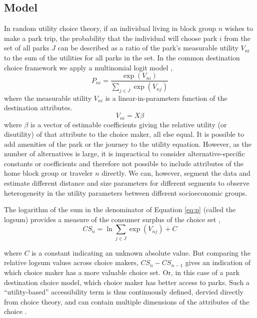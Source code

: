 \documentclass[3p, authoryear]{elsarticle} %
\begin{document}
\hypertarget{model}{%
\subsection{Model}\label{model}}

In random utility choice theory, if an individual living in block group \(n\)
wishes to make a park trip, the probability that the individual will choose
park \(i\) from the set of all parks \(J\) can be described as a ratio of the
park's measurable utility \(V_{ni}\) to the sum of the utilities for all parks
in the set. In the common destination choice framework we apply a
multinomial logit model \citep[\citet{Recker1978}]{McFadden1974},
\begin{equation}\label{eq:p}
   P_{ni} = \frac{\exp(V_{ni})}{\sum_{j \in J}\exp(V_{nj})}
\end{equation}
where the measurable utility \(V_{ni}\) is a linear-in-parameters function of
the destination attributes.
\begin{equation}\label{eq:V}
V_{ni} = X\beta
\end{equation}
where \(\beta\) is a vector of estimable coefficients giving the relative utility
(or disutility) of that attribute to the choice maker, all else equal. It is
possible to add amenities of the park or the journey to the utility
equation. However, as the number of alternatives is large, it is impractical to
consider alternative-specific constants or coefficients and therefore not
possible to include attributes of the home block group or traveler \(n\) directly.
We can, however, segment the data and estimate different distance and size
parameters for different segments to observe heterogeneity in the utility
parameters between different socioeconomic groups.

The logarithm of the sum in the denominator of Equation \ref{eq:p} (called the
logsum) provides a measure of the consumer surplus of the choice set
\citep{Williams1977a},
\begin{equation}
CS_n = \ln{{\sum_{j \in J}\exp(V_{nj})}} + C
  \label{eq:logsum}
\end{equation}

where \(C\) is a constant indicating an unknown absolute value. But comparing the
relative logsum values across choice makers, \(CS_n - CS_{n-1}\) gives an
indication of which choice maker has a more valuable choice set. Or, in this
case of a park destination choice model, which choice maker has better access to
parks. Such a ``utility-based'' accessibility term is thus continuously defined,
dervied directly from choice theory, and can contain multiple dimensions of the
attributes of the choice \citep{Handy1997, Dong2006}.
\end{document}
